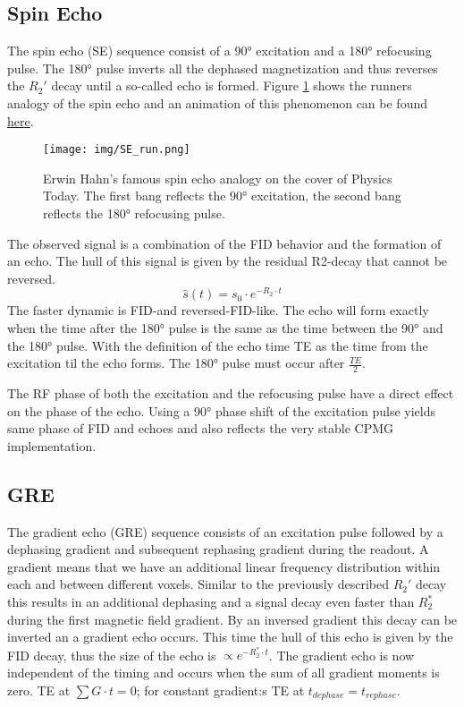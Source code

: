 \documentclass[a4paper,12pt]{extarticle}
\begin{document}
\subsection{Spin Echo}
The spin echo (SE) sequence consist of a 90° excitation and a 180° refocusing pulse. The 180° pulse inverts all the dephased magnetization and thus reverses the $R_2'$ decay until a so-called echo is formed. Figure \ref{fig:SE_hahn}  shows the runners analogy of the spin echo and an animation of this phenomenon can be found \href{https://blog.ismrm.org/2017/06/06/dwe-part-2/}{here}.  

\begin{figure}[!ht] 
\centering
\texttt{[image: img/SE\_run.png]}
\caption{Erwin Hahn’s famous spin echo analogy on the cover of Physics Today. The first bang reflects the 90° excitation, the second bang reflects the 180° refocusing pulse.} \label{fig:SE_hahn}
\end{figure}
The observed signal is a combination of the FID behavior and the formation of an echo. The hull of this signal is given by the residual R2-decay that cannot be reversed. 
\begin{equation}
\label{eq:SE}
\hat{s}(t)=s_0\cdot  e^{-R_2\cdot t}
\end{equation}
The faster dynamic is FID-and reversed-FID-like.
The echo will form exactly when the time after the 180° pulse is the same as the time between the 90° and the 180° pulse. With the definition of the echo time TE as the time from the excitation til the echo forms. The 180° pulse must occur after $\frac{TE}{2}$.

The RF phase of both the excitation and the refocusing pulse have a direct effect on the phase of the echo. Using a 90° phase shift of the excitation pulse yields same phase of FID and echoes and also reflects the very stable CPMG implementation.



\subsection{GRE}
The gradient echo (GRE) sequence consists of an excitation pulse followed by a dephasing gradient and subsequent rephasing gradient during the readout.
A gradient means that we have an additional linear frequency distribution within each and between different voxels. Similar to the previously described $R_2'$ decay this results in an additional dephasing and a signal decay even faster than $R_2^*$ during the first magnetic field gradient. By an inversed gradient this decay can be inverted an a gradient echo occurs.
This time the hull of this echo is given by the FID decay, thus the size of the echo is $\propto e^{-R_2^*\cdot t}$.
The gradient echo is now independent of the timing and occurs when the sum of all gradient moments is zero.
TE at  $\sum G\cdot t=0$; for constant gradient:s TE at $t_{dephase}=t_{rephase}$.
\end{document}
